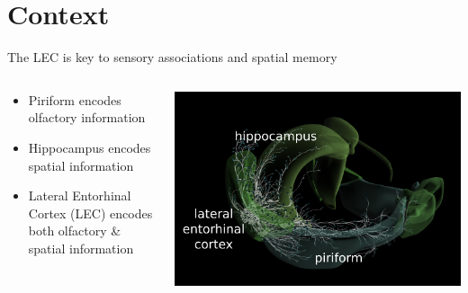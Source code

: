 \documentclass[bigger]{beamer}
\begin{document}
\section*{Context}
\label{sec:orge0a6f3f}
\begin{frame}[label={sec:org2d5aee1}]{The LEC is key to sensory associations and spatial memory}
\begin{columns}
\begin{column}{0.45\columnwidth}
\footnotesize
\begin{itemize}
\item \alert{Piriform} encodes olfactory information
\item \alert{Hippocampus} encodes spatial information
\item \alert{Lateral Entorhinal Cortex (LEC)} encodes both olfactory \& spatial information
\end{itemize}
\end{column}
\begin{column}{0.55\columnwidth}
\begin{center}
\includegraphics[width=\textwidth]{img/brain.png}
\end{center}
\end{column}
\end{columns}
\end{frame}
\end{document}
